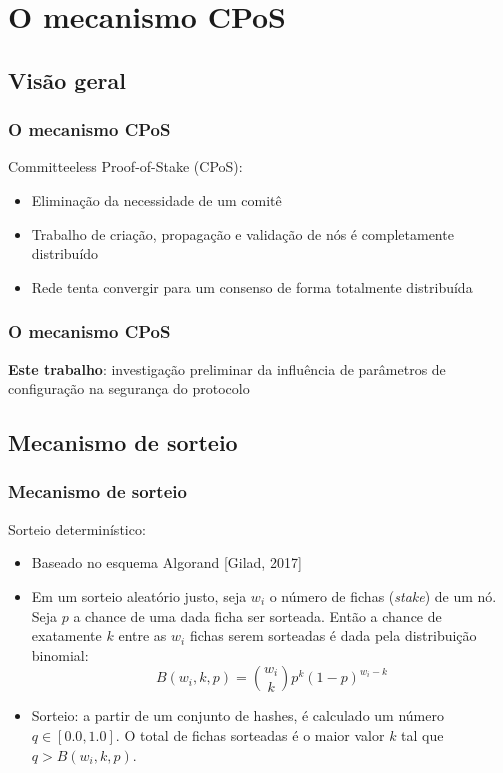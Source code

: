 \documentclass{beamer}
\begin{document}
\section{O mecanismo CPoS}
\subsection{Visão geral}
\begin{frame}
\frametitle{O mecanismo CPoS}
Committeeless Proof-of-Stake (CPoS): 
\begin{itemize}
    \item Eliminação da necessidade de um comitê
    \item Trabalho de criação, propagação e validação
          de nós é completamente distribuído
    \item Rede tenta convergir para um consenso de forma totalmente distribuída
\end{itemize}
\end{frame}

\begin{frame}
    \frametitle{O mecanismo CPoS}
    \textbf{Este trabalho}: investigação preliminar da influência de parâmetros de configuração na segurança do protocolo
\end{frame}

\subsection{Mecanismo de sorteio}
\begin{frame}
\frametitle{Mecanismo de sorteio}
Sorteio determinístico:
\begin{itemize}
    \item Baseado no esquema Algorand [Gilad, 2017]
    \item Em um sorteio aleatório justo, seja $w_i$ o número de fichas (\textit{stake}) de um nó. Seja $p$ a chance de uma dada ficha ser sorteada. Então a chance de exatamente $k$ entre as $w_i$ fichas serem sorteadas é dada pela distribuição binomial:
        \begin{equation*}
            B(w_i, k, p) = \binom{w_i}{k} p^k (1-p)^{w_i - k}
        \end{equation*}
    \item Sorteio: a partir de um conjunto de hashes, é calculado um número $q \in [0.0, 1.0]$. O total de fichas sorteadas é o maior valor $k$ tal que $q > B(w_i, k, p)$.
\end{itemize}
\end{frame}
\end{document}
